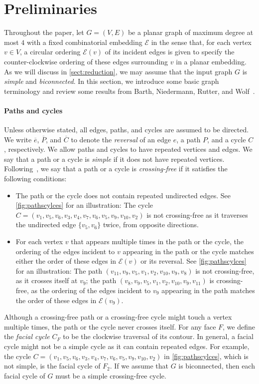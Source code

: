 \documentclass{theoretics}
\newcommand{\EE}{\mathcal{E}}
\begin{document}
\section{Preliminaries}\label{sect:prelim}

Throughout the paper, let $G=(V,E)$ be a planar graph of maximum degree at most $4$ with a fixed combinatorial embedding $\EE$ in the sense that, for each vertex $v \in V$, a circular ordering $\EE(v)$ of its incident edges is given to specify the counter-clockwise ordering of these edges surrounding $v$ in a planar embedding. As we will discuss in \cref{sect:reduction}, we may assume that the input graph $G$ is \emph{simple} and \emph{biconnected}. 
In this section, we introduce some basic graph terminology and review some results from Barth, Niedermann, Rutter, and Wolf~\cite{barth2023topology}.


\paragraph{Paths and cycles} Unless otherwise stated, all edges, paths, and cycles are assumed to be directed. We write $\overline{e}$, $\overline{P}$, and $\overline{C}$ to denote the \emph{reversal} of an edge $e$, a path $P$, and a cycle $C$, respectively. We allow paths and cycles to have repeated vertices and edges. We say that a path or a cycle is \emph{simple} if it does not have repeated vertices.
Following~\cite{barth2023topology}, we say that a path or a cycle is \emph{crossing-free} if it satisfies the following conditions:
\begin{itemize}
    \item The path or the cycle does not contain repeated undirected edges. See \cref{fig:pathscylces} for an illustration: The cycle $C = (v_1, v_5, v_6, v_3, v_4, v_7, v_6, v_5, v_9, v_{10}, v_2)$ is not crossing-free as it traverses the undirected edge $\{v_5, v_6\}$ twice, from opposite directions.
    \item For each vertex $v$ that appears multiple times in the path or the cycle, the ordering of the edges incident to $v$ appearing in the path or the cycle matches either the order of these edges in $\EE(v)$ or its reversal. See \cref{fig:pathscylces} for an illustration: The path $(v_{11}, v_9, v_5, v_1, v_2, v_{10}, v_9, v_8)$ is not crossing-free, as it crosses itself at $v_9$; the path $(v_{8}, v_9, v_5, v_1, v_2, v_{10}, v_9, v_{11})$ is crossing-free, as the ordering of the edges incident to $v_9$ appearing in the path matches the order of these edges in $\EE(v_9)$.
\end{itemize}
 Although a crossing-free path or a crossing-free cycle might touch a vertex multiple times, the path or the cycle never crosses itself.
For any face $F$, we define the \emph{facial cycle} $C_F$ to be the clockwise traversal of its contour. 
In general, a facial cycle might not be a simple cycle as it can contain repeated edges. For example, the cycle $C = (v_1, v_5, v_6, v_3, v_4, v_7, v_6, v_5, v_9, v_{10}, v_2)$ in \cref{fig:pathscylces}, which is not simple, is the facial cycle of $F_2$.
If we assume that $G$ is biconnected, then each facial cycle of $G$ must be a simple crossing-free cycle. 
\end{document}
